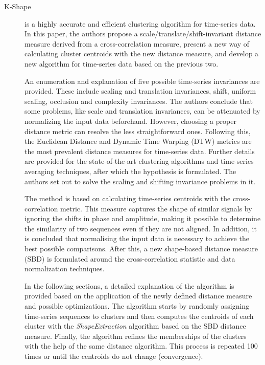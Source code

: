 \begin{description}
    \item[K-Shape]\cite{Paparrizos.Gravano_kShapeEfficientAccurate_2015a} is a highly accurate and efficient clustering algorithm for time-series data. In this paper, the authors propose a scale/translate/shift-invariant distance measure derived from a cross-correlation measure, present a new way of calculating cluster centroids with the new distance measure, and develop a new algorithm for time-series data based on the previous two.
    
    An enumeration and explanation of five possible time-series invariances are provided. These include scaling and translation invariances, shift, uniform scaling, occlusion and complexity invariances. The authors conclude that some problems, like scale and translation invariances, can be attenuated by normalizing the input data beforehand. However, choosing a proper distance metric can resolve the less straightforward ones. Following this, the Euclidean Distance and Dynamic Time Warping (DTW) metrics are the most prevalent distance measures for time-series data. Further details are provided for the state-of-the-art clustering algorithms and time-series averaging techniques, after which the hypothesis is formulated. The authors set out to solve the scaling and shifting invariance problems in it.

    The method is based on calculating time-series centroids with the cross-correlation metric. This measure captures the shape of similar signals by ignoring the shifts in phase and amplitude, making it possible to determine the similarity of two sequences even if they are not aligned. In addition, it is concluded that normalising the input data is necessary to achieve the best possible comparisons. After this, a new shape-based distance measure (SBD) is formulated around the cross-correlation statistic and data normalization techniques.

    In the following sections, a detailed explanation of the algorithm is provided based on the application of the newly defined distance measure and possible optimizations. The algorithm starts by randomly assigning time-series sequences to clusters and then computes the centroids of each cluster with the \textit{ShapeExtraction} algorithm based on the SBD distance measure. Finally, the algorithm refines the memberships of the clusters with the help of the same distance algorithm. This process is repeated 100 times or until the centroids do not change (convergence).


\end{description}
